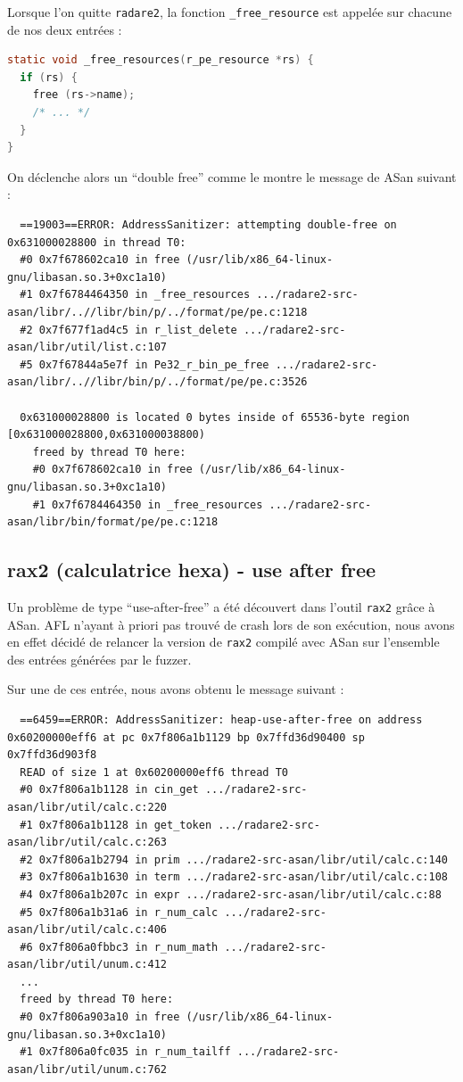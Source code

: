 Lorsque l'on quitte \lstinline{radare2}, la fonction \lstinline{_free_resource} est appelée sur chacune de nos deux entrées :

\begin{lstlisting}[language=C]
static void _free_resources(r_pe_resource *rs) {
  if (rs) {
    free (rs->name);
    /* ... */
  }
}
\end{lstlisting}

On déclenche alors un ``double free'' comme le montre le message de ASan suivant :

\begin{lstlisting}
  ==19003==ERROR: AddressSanitizer: attempting double-free on 0x631000028800 in thread T0:
  #0 0x7f678602ca10 in free (/usr/lib/x86_64-linux-gnu/libasan.so.3+0xc1a10)
  #1 0x7f6784464350 in _free_resources .../radare2-src-asan/libr/..//libr/bin/p/../format/pe/pe.c:1218
  #2 0x7f677f1ad4c5 in r_list_delete .../radare2-src-asan/libr/util/list.c:107
  #5 0x7f67844a5e7f in Pe32_r_bin_pe_free .../radare2-src-asan/libr/..//libr/bin/p/../format/pe/pe.c:3526

  0x631000028800 is located 0 bytes inside of 65536-byte region [0x631000028800,0x631000038800)
    freed by thread T0 here:
    #0 0x7f678602ca10 in free (/usr/lib/x86_64-linux-gnu/libasan.so.3+0xc1a10)
    #1 0x7f6784464350 in _free_resources .../radare2-src-asan/libr/bin/format/pe/pe.c:1218
\end{lstlisting}


\subsection{rax2 (calculatrice hexa) - use after free}

Un problème de type ``use-after-free'' a été découvert dans l'outil \lstinline{rax2} grâce à ASan.
AFL n'ayant à priori pas trouvé de crash lors de son exécution, nous avons en effet décidé de relancer la version de \lstinline{rax2} compilé avec ASan sur l'ensemble des entrées générées par le fuzzer.

Sur une de ces entrée, nous avons obtenu le message suivant :

\begin{lstlisting}
  ==6459==ERROR: AddressSanitizer: heap-use-after-free on address 0x60200000eff6 at pc 0x7f806a1b1129 bp 0x7ffd36d90400 sp 0x7ffd36d903f8
  READ of size 1 at 0x60200000eff6 thread T0
  #0 0x7f806a1b1128 in cin_get .../radare2-src-asan/libr/util/calc.c:220
  #1 0x7f806a1b1128 in get_token .../radare2-src-asan/libr/util/calc.c:263
  #2 0x7f806a1b2794 in prim .../radare2-src-asan/libr/util/calc.c:140
  #3 0x7f806a1b1630 in term .../radare2-src-asan/libr/util/calc.c:108
  #4 0x7f806a1b207c in expr .../radare2-src-asan/libr/util/calc.c:88
  #5 0x7f806a1b31a6 in r_num_calc .../radare2-src-asan/libr/util/calc.c:406
  #6 0x7f806a0fbbc3 in r_num_math .../radare2-src-asan/libr/util/unum.c:412
  ...
  freed by thread T0 here:
  #0 0x7f806a903a10 in free (/usr/lib/x86_64-linux-gnu/libasan.so.3+0xc1a10)
  #1 0x7f806a0fc035 in r_num_tailff .../radare2-src-asan/libr/util/unum.c:762
\end{lstlisting}

